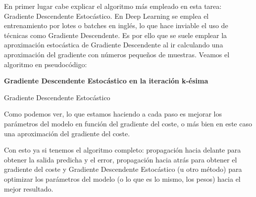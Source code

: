 En primer lugar cabe explicar el algoritmo más empleado en esta tarea: Gradiente Descendente Estocástico. En Deep Learning se emplea el entrenamiento por lotes o batches en inglés, lo que hace inviable el uso de técnicas como Gradiente Descendente. Es por ello que se suele emplear la aproximación estocástica de Gradiente Descendente al ir calculando una aproximación del gradiente con números pequeños de muestras. Veamos el algoritmo en pseudocódigo:

\begin{algorithm}[H]{\Large{\textbf{Gradiente Descendente Estocástico en la iteración k-ésima}}}
	
	\vspace{15px}
	
	\caption{Gradiente Descendente Estocástico}
	\label{alg:sgd}
	
	\vspace{10px}
	
	
	\vspace{10px}
	
	
	\vspace{5px}
\end{algorithm}

Como podemos ver, lo que estamos haciendo a cada paso es mejorar los parámetros del modelo en función del gradiente del coste, o más bien en este caso una aproximación del gradiente del coste. 

Con esto ya si tenemos el algoritmo completo: propagación hacia delante para obtener la salida predicha y el error, propagación hacia atrás para obtener el gradiente del coste y Gradiente Descendente Estocástico (u otro método) para optimizar los parámetros del modelo (o lo que es lo mismo, los pesos) hacia el mejor resultado.

